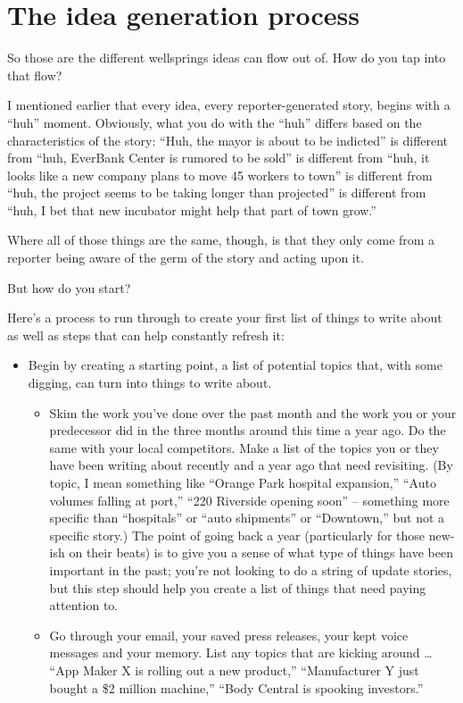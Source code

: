 \documentclass[
  11pt,
  american,
  letterpaperpaper,
  extrafontsizes,onecolumn,openright
  ]{memoir}
\providecommand{\tightlist}{%
  \setlength{\itemsep}{0pt}\setlength{\parskip}{0pt}}
\begin{document}
\hypertarget{the-idea-generation-process}{%
\section*{The idea generation process}\label{the-idea-generation-process}}

So those are the different wellsprings ideas can flow out of. How do you tap into that flow?

I mentioned earlier that every idea, every reporter-generated story, begins with a \enquote{huh} moment. Obviously, what you do with the \enquote{huh} differs based on the characteristics of the story: \enquote{Huh, the mayor is about to be indicted} is different from \enquote{huh, EverBank Center is rumored to be sold} is different from \enquote{huh, it looks like a new company plans to move 45 workers to town} is different from \enquote{huh, the project seems to be taking longer than projected} is different from \enquote{huh, I bet that new incubator might help that part of town grow.}

Where all of those things are the same, though, is that they only come from a reporter being aware of the germ of the story and acting upon it.

But how do you start?

Here's a process to run through to create your first list of things to write about as well as steps that can help constantly refresh it:

\begin{itemize}
\tightlist
\item
  Begin by creating a starting point, a list of potential topics that, with some digging, can turn into things to write about.

  \begin{itemize}
  \tightlist
  \item
    Skim the work you've done over the past month and the work you or your predecessor did in the three months around this time a year ago. Do the same with your local competitors. Make a list of the topics you or they have been writing about recently and a year ago that need revisiting. (By topic, I mean something like \enquote{Orange Park hospital expansion,} \enquote{Auto volumes falling at port,} \enquote{220 Riverside opening soon} -- something more specific than \enquote{hospitals} or \enquote{auto shipments} or \enquote{Downtown,} but not a specific story.) The point of going back a year (particularly for those new-ish on their beats) is to give you a sense of what type of things have been important in the past; you're not looking to do a string of update stories, but this step should help you create a list of things that need paying attention to.
  \item
    Go through your email, your saved press releases, your kept voice messages and your memory. List any topics that are kicking around \ldots{} \enquote{App Maker X is rolling out a new product,} \enquote{Manufacturer Y just bought a \$2 million machine,} \enquote{Body Central is spooking investors.}
  \end{itemize}
\end{itemize}
\end{document}
